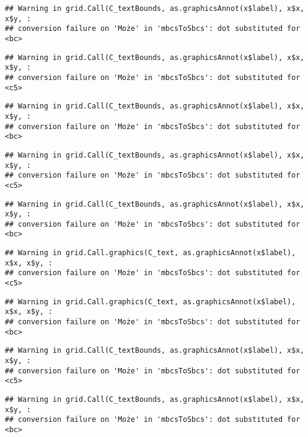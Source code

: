 \documentclass[
]{book}
\begin{document}
\begin{verbatim}
## Warning in grid.Call(C_textBounds, as.graphicsAnnot(x$label), x$x, x$y, :
## conversion failure on 'Może' in 'mbcsToSbcs': dot substituted for <bc>
\end{verbatim}

\begin{verbatim}
## Warning in grid.Call(C_textBounds, as.graphicsAnnot(x$label), x$x, x$y, :
## conversion failure on 'Może' in 'mbcsToSbcs': dot substituted for <c5>
\end{verbatim}

\begin{verbatim}
## Warning in grid.Call(C_textBounds, as.graphicsAnnot(x$label), x$x, x$y, :
## conversion failure on 'Może' in 'mbcsToSbcs': dot substituted for <bc>
\end{verbatim}

\begin{verbatim}
## Warning in grid.Call(C_textBounds, as.graphicsAnnot(x$label), x$x, x$y, :
## conversion failure on 'Może' in 'mbcsToSbcs': dot substituted for <c5>
\end{verbatim}

\begin{verbatim}
## Warning in grid.Call(C_textBounds, as.graphicsAnnot(x$label), x$x, x$y, :
## conversion failure on 'Może' in 'mbcsToSbcs': dot substituted for <bc>
\end{verbatim}

\begin{verbatim}
## Warning in grid.Call.graphics(C_text, as.graphicsAnnot(x$label), x$x, x$y, :
## conversion failure on 'Może' in 'mbcsToSbcs': dot substituted for <c5>
\end{verbatim}

\begin{verbatim}
## Warning in grid.Call.graphics(C_text, as.graphicsAnnot(x$label), x$x, x$y, :
## conversion failure on 'Może' in 'mbcsToSbcs': dot substituted for <bc>
\end{verbatim}

\begin{verbatim}
## Warning in grid.Call(C_textBounds, as.graphicsAnnot(x$label), x$x, x$y, :
## conversion failure on 'Może' in 'mbcsToSbcs': dot substituted for <c5>
\end{verbatim}

\begin{verbatim}
## Warning in grid.Call(C_textBounds, as.graphicsAnnot(x$label), x$x, x$y, :
## conversion failure on 'Może' in 'mbcsToSbcs': dot substituted for <bc>
\end{verbatim}
\end{document}
